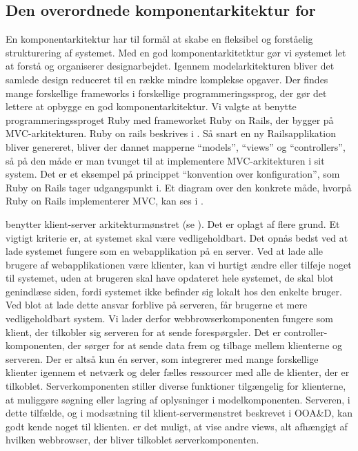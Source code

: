 \subsection{Den overordnede komponentarkitektur for \Foodl}
\label{sec:overordnetkomponent}
En komponentarkitektur har til formål at skabe en fleksibel og forståelig strukturering af systemet. Med en god komponentarkitetktur gør vi systemet let at forstå og organiserer designarbejdet. Igennem modelarkitekturen bliver det samlede design reduceret til en række mindre komplekse opgaver\cite[s.~185]{ooad}. Der findes mange forskellige frameworks i forskellige programmeringssprog, der gør det lettere at opbygge en god komponentarkitektur. Vi valgte at benytte programmeringssproget Ruby med frameworket Ruby on Rails, der bygger på MVC-arkitekturen. Ruby on rails beskrives i . Så snart en ny Railsapplikation bliver genereret, bliver der dannet mapperne ``models'', ``views'' og ``controllers'', så på den måde er man tvunget til at implementere MVC-arkitekturen i sit system. Det er et eksempel på princippet ``konvention over konfiguration'', som Ruby on Rails tager udgangspunkt i. Et diagram over den konkrete måde, hvorpå Ruby on Rails implementerer MVC, kan ses i .

\Foodl{} benytter klient-server arkitekturmønstret (se ). Det er oplagt af flere grund. Et vigtigt kriterie er, at systemet skal være vedligeholdbart. Det opnås bedst ved at lade systemet fungere som en webapplikation på en server. Ved at lade alle brugere af webapplikationen være klienter, kan vi hurtigt ændre eller tilføje noget til systemet, uden at brugeren skal have opdateret hele systemet, de skal blot genindlæse siden, fordi systemet ikke befinder sig lokalt hos den enkelte bruger. Ved blot at lade dette ansvar forblive på serveren, får brugerne et mere vedligeholdbart system. Vi lader derfor webbrowserkomponenten fungere som klient, der tilkobler sig serveren for at sende forespørgsler. Det er controller-komponenten, der sørger for at sende data frem og tilbage mellem klienterne og serveren. Der er altså kun én server, som integrerer med mange forskellige klienter igennem et netværk og deler fælles ressourcer med alle de klienter, der er tilkoblet. Serverkomponenten stiller diverse funktioner tilgængelig for klienterne, \fx at muliggøre søgning eller lagring af oplysninger i modelkomponenten. Serveren, i dette tilfælde, og i modsætning til klient-servermønstret beskrevet i OOA\&D\cite{ooad}, kan godt kende noget til klienten. \Fx er det muligt, at vise andre views, alt afhængigt af hvilken webbrowser, der bliver tilkoblet serverkomponenten.

